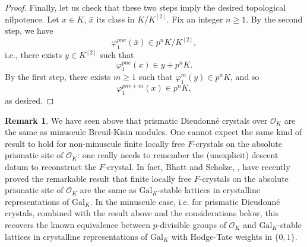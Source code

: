 \documentclass{amsart}
\theoremstyle{plain}
\newtheorem{proposition}[theorem]{Proposition}
\theoremstyle{definition}
\newtheorem{remark}[theorem]{Remark}
\newcommand{\red}[1]{{\color{black} #1}}
\begin{document}
\begin{proof}
Finally, let us check that these two steps imply the desired topological nilpotence. Let $x \in K$, $\bar{x}$ its class in $K/K^{[2]}$. Fix an integer $n\geq 1$. By the second step, we have 
\[ \varphi_1^{pne}(\bar{x}) \in p^n K/K^{[2]}, \]
i.e., there exists $y \in K^{[2]}$ such that  
\[ \varphi_1^{pne}(x)\in y + p^n K. \]
By the first step, there exists $m \geq 1$ such that $\varphi_1^m(y) \in p^n K$, and so 
\[ \varphi_1^{pne+m}(x) \in p^n K, \]
as desired.
\end{proof}


\begin{remark}
\label{bhatt-scholze-absolute-prysmatic-crystals}
We have seen above that prismatic Dieudonn\'e crystals over $\mathcal{O}_K$ are the same as minuscule Breuil-Kisin modules. One cannot expect the same kind of result to hold for non-minuscule finite locally free $F$-crystals on the absolute prismatic site of $\mathcal{O}_K$: one really needs to remember the (unexplicit) descent datum to reconstruct the $F$-crystal. \red{In fact, Bhatt and Scholze, \cite{bhatt2021prismatic}, have recently proved} the remarkable result that finite locally free $F$-crystals on the absolute prismatic site of $\mathcal{O}_K$ are the same as $\mathrm{Gal}_K$-stable lattices in crystalline representations of $\mathrm{Gal}_K$. In the minuscule case, i.e. for prismatic Dieudonn\'e crystals, combined with the result above and the considerations below, this recovers the known equivalence between $p$-divisible groups of $\mathcal{O}_K$ and $\mathrm{Gal}_K$-stable lattices in crystalline representations of $\mathrm{Gal}_K$ with Hodge-Tate weights in $\{0,1\}$. 
\end{remark}




\end{document}
